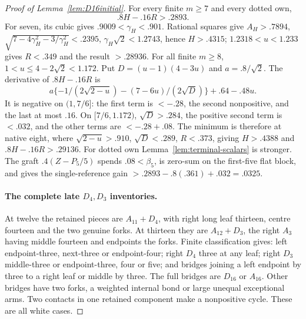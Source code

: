 \documentclass[11pt]{article}
\begin{document}
\begin{proof}[Proof of Lemma~\ref{lem:D16initial}]
For every finite $m\ge7$ and every dotted own,
\begin{equation}\label{eq:D16headgain}
 .8H-.16R>.2893 .
\end{equation}
For seven, its cubic gives $.9009<\gamma_H<.901$.
Rational squares give $A_H>.7894$,
$\sqrt{7-4\gamma_H^2-3/\gamma_H^2}<.2395$,
$\gamma_H\sqrt2<1.2743$, hence $H>.4315$;
$1.2318<u<1.233$ gives $R<.349$ and the result $>.28936$.
For all finite $m\ge8$, $1<u\le4-2\sqrt2<1.172$.
Put $D=(u-1)(4-3u)$ and $a=.8/\sqrt2$.
The derivative of $.8H-.16R$ is
\[
a\{-1/(2\sqrt{2-u})-(7-6u)/(2\sqrt D)\}+.64-.48u .
\]
It is negative on $(1,7/6]$: the first term is $<-.28$,
the second nonpositive, and the last at most $.16$.
On $[7/6,1.172)$, $\sqrt D>.284$, the positive second term is
$<.032$, and the other terms are $<-.28+.08$.
The minimum is therefore at native eight, where
$\sqrt{2-u}>.910$, $\sqrt D<.289$, $R<.373$, giving
$H>.4388$ and $.8H-.16R>.29136$.
For dotted own Lemma~\ref{lem:terminal-scalars} is stronger.
The graft $.4(Z-P_5/5)$ spends $.08<\beta_5$, is zero-sum
on the first-five flat block, and gives the single-reference gain
$>.2893-.8(.361)+.032=.0325$.

\paragraph{The complete late $D_4,D_3$ inventories.}
At twelve the retained pieces are $A_{11}+D_4$, with right long
leaf thirteen, centre fourteen and the two genuine forks.
At thirteen they are $A_{12}+D_3$, the right $A_3$ having middle
fourteen and endpoints the forks. Finite classification gives:
left endpoint-three, next-three or endpoint-four; right $D_4$
three at any leaf; right $D_3$ middle-three or endpoint-three,
four or five; and bridges joining a left endpoint by three to a
right leaf or middle by three. The full bridges are $D_{16}$ or
$A_{16}$. Other bridges have two forks, a weighted internal bond
or large unequal exceptional arms. Two contacts in one retained
component make a nonpositive cycle. These are all white cases.


\end{proof}
\end{document}
